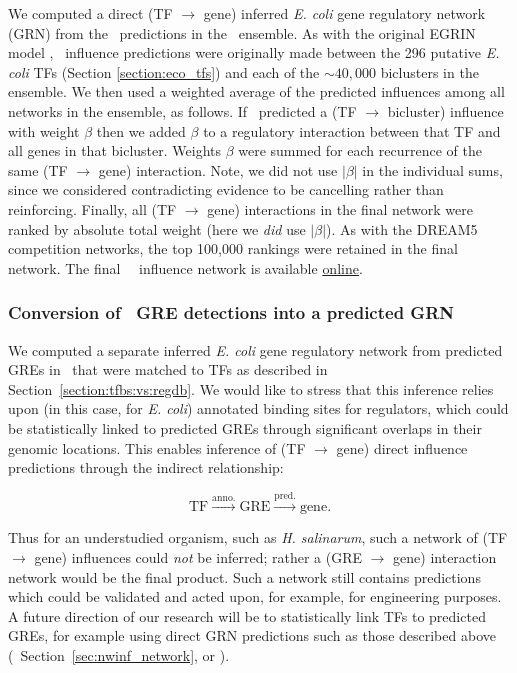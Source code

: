 We computed a direct (TF $\rightarrow$ gene) inferred {\it E. coli} gene regulatory network (GRN) from the \nwinf~predictions in the \egrine~ensemble. As with the original EGRIN model \cite{bonneau_predictive_2007}, \nwinf~influence predictions were originally made between the 296 putative {\it E. coli} TFs (Section \ref{section:eco_tfs}) and each of the $\sim 40,000$ biclusters in the ensemble. We then used a weighted average of the predicted influences among all networks in the ensemble, as follows. If \nwinf~predicted a (TF $\rightarrow$ bicluster) influence with weight $\beta$ then we added $\beta$ to a regulatory interaction between that TF and all genes in that bicluster. Weights $\beta$ were summed for each recurrence of the same (TF $\rightarrow$ gene) interaction. Note, we did not use $|\beta|$ in the individual sums, since we considered contradicting evidence to be cancelling rather than reinforcing. Finally, all (TF $\rightarrow$ gene) interactions in the final network were ranked by absolute total weight (here we {\it did} use $|\beta|$). As with the DREAM5 competition networks, the top 100,000 rankings were retained in the final network. The final \egrine~\nwinf~influence network is available \href{http://egrin2.systemsbiology.net/}{online}. 

\subsubsection{Conversion of \egrine~GRE detections into a predicted GRN}
\label{section:gre_grn_construction}

We computed a separate inferred {\it E. coli} gene regulatory network from predicted GREs in \egrine\ that were matched to TFs as described in Section~\ref{section:tfbs:vs:regdb}. We would like to stress that this inference relies upon (in this case, for {\it E. coli}) annotated binding sites for regulators, which could be statistically linked to predicted GREs through significant overlaps in their genomic locations. This enables inference of (TF $\rightarrow$ gene) direct influence predictions through the indirect relationship:

\begin{equation}
\label{eq:gre_network_relation}
\mathrm{TF} \overset{\mathrm{anno.}}{\rightarrow} \mathrm{GRE} \overset{\mathrm{pred.}}{\rightarrow} \mathrm{gene}.
\end{equation}

\noindent Thus for an understudied organism, such as {\it H. salinarum}, such a network of (TF $\rightarrow$ gene) influences could {\it not} be inferred; rather a (GRE $\rightarrow$ gene) interaction network would be the final product. Such a network still contains predictions which could be validated and acted upon, for example, for engineering purposes. A future direction of our research will be to statistically link TFs to predicted GREs, for example using direct GRN predictions such as those described above (\eg\ Section~\ref{sec:nwinf_network}, or \cite{marbach_wisdom_2012}).

